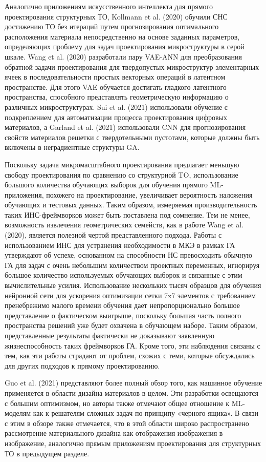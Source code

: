 Аналогично приложениям искусственного интеллекта для прямого проектирования структурных ТО, Kollmann et al. (2020) обучили СНС достижению ТО без итераций путем прогнозирования оптимального расположения материала непосредственно на основе заданных параметров, определяющих проблему для задач проектирования микроструктуры в серой шкале. Wang et al. (2020) разработали пару VAE-ANN для преобразования обратной задачи проектирования для твердопустых микроструктур элементарных ячеек в последовательности простых векторных операций в латентном пространстве. Для этого VAE обучается достигать гладкого латентного пространства, способного представлять геометрическую информацию о различных микроструктурах. Sui et al. (2021) использовали обучение с подкреплением для автоматизации процесса проектирования цифровых материалов, а Garland et al. (2021) использовали CNN для прогнозирования свойств материалов решетки с твердотельными пустотами, которые должны быть включены в неградиентные структуры GA.

Поскольку задача микромасштабного проектирования предлагает меньшую свободу проектирования по сравнению со структурной TO, использование большого количества обучающих выборок для обучения прямого ML-приложения, похожего на проектирование, увеличивает вероятность наложения обучающих и тестовых данных. Таким образом, измеряемая производительность таких ИНС-фреймворков может быть поставлена под сомнение. Тем не менее, возможность извлечения геометрических семейств, как в работе Wang et al. (2020), является полезной чертой представленного подхода. Работы с использованием ИНС для устранения необходимости в МКЭ в рамках ГА утверждают об успехе, основанном на способности НС превосходить обычную ГА для задач с очень небольшим количеством проектных переменных, игнорируя большое количество используемых обучающих выборок и связанные с этим вычислительные усилия. Использование нескольких тысяч образцов для обучения нейронной сети для ускорения оптимизации сетки 7x7 элементов с требованием пренебрежимо малого времени обучения дает непропорционально большое представление о фактическом выигрыше, поскольку большая часть полного пространства решений уже будет охвачена в обучающем наборе. Таким образом, представленные результаты фактически не доказывают заявленную жизнеспособность таких фреймворков ГА. Кроме того, эти наблюдения связаны с тем, как эти работы страдают от проблем, схожих с теми, которые обсуждались для других подходов к прямому проектированию.

Guo et al. (2021) представляют более полный обзор того, как машинное обучение применяется в области дизайна материалов в целом. Эти разработки освещаются с большим оптимизмом, но авторы также отмечают общее отношение к ML-моделям как к решателям сложных задач по принципу «черного ящика». В связи с этим в обзоре также отмечается, что в этой области широко распространено рассмотрение материального дизайна как отображения изображения в изображение, аналогично прямым приложениям проектирования для структурных ТО в предыдущем разделе.

